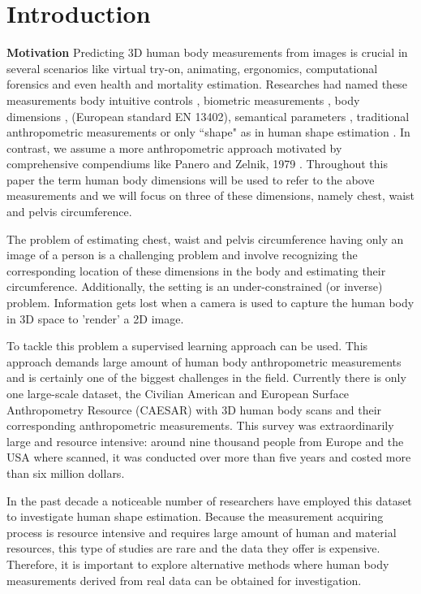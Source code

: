 \documentclass[runningheads, orivec]{llncs}
\begin{document}
\section{Introduction}\label{sec:intro}
\textbf{Motivation} 
Predicting 3D human body measurements from images is crucial in several 
scenarios 
like virtual try-on, animating, ergonomics, computational forensics and 
even health and mortality estimation. Researches had 
named these
measurements body intuitive controls \cite{Allen.2003}, biometric 
measurements \cite{Sigal.2008}, body dimensions 
\cite{DBLP:conf/bmvc/ChenRC11}, (European standard EN 13402), semantical 
parameters \cite{Yang.2014}, 
traditional anthropometric 
measurements 
\cite{Wuhrer2011} or only ``shape" as in human shape estimation 
\cite{Guan.2013,Bogo:ECCV:2016,Loper.2015,Dibra.2016a,Pishchulin.2017}. In 
contrast, we assume a more 
anthropometric approach 
motivated by comprehensive compendiums like Panero and Zelnik, 1979 
\cite{panero1979human}.
Throughout this paper the term human body 
dimensions 
will be used to refer to the above measurements and we will focus on three of 
these dimensions, namely chest, waist and 
pelvis circumference.

The problem of estimating chest, waist and 
pelvis circumference having only an image of a person is a challenging problem 
and involve recognizing the corresponding location of these dimensions in the 
body and estimating their circumference. Additionally, the setting is an  
under-constrained  (or inverse) problem. Information 
gets lost when a camera is 
used to capture the human body in 3D space to 'render' a 2D image. 

To tackle this problem a supervised learning approach can be used. This approach
demands large amount of human body anthropometric measurements and is certainly 
one of the biggest challenges in the field.  Currently there 
is only one large-scale dataset, the Civilian American and 
European Surface Anthropometry Resource (CAESAR) \cite{robinette1999caesar} 
with 3D human body scans and their corresponding anthropometric measurements. 
This survey was extraordinarily large and resource intensive: around nine 
thousand people from Europe and the USA where scanned, it was conducted over 
more than five years and costed more than six million dollars.

In the past decade a noticeable number of researchers have employed this 
dataset to investigate human shape estimation. Because the measurement 
acquiring process is resource intensive and requires large amount of human and 
material resources, this type of studies are rare and the data they offer is 
expensive. Therefore, it is important to explore alternative methods where 
human body measurements derived from real data can be obtained for 
investigation.
\end{document}
